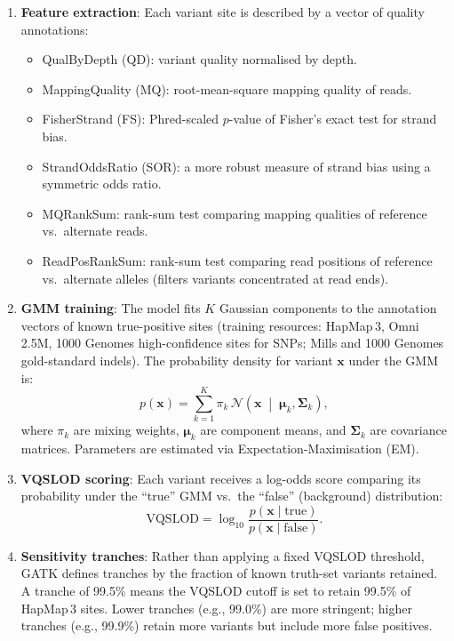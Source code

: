\begin{enumerate}[nosep]
  \item \textbf{Feature extraction}: Each variant site is described by a vector of quality annotations:
    \begin{itemize}[nosep]
      \item QualByDepth (QD): variant quality normalised by depth.
      \item MappingQuality (MQ): root-mean-square mapping quality of reads.
      \item FisherStrand (FS): Phred-scaled $p$-value of Fisher's exact test for strand bias.
      \item StrandOddsRatio (SOR): a more robust measure of strand bias using a symmetric odds ratio.
      \item MQRankSum: rank-sum test comparing mapping qualities of reference vs.\ alternate reads.
      \item ReadPosRankSum: rank-sum test comparing read positions of reference vs.\ alternate alleles (filters variants concentrated at read ends).
    \end{itemize}
  \item \textbf{GMM training}: The model fits $K$ Gaussian components to the annotation vectors of known true-positive sites (training resources: HapMap\,3, Omni\,2.5M, 1000 Genomes high-confidence sites for SNPs; Mills and 1000 Genomes gold-standard indels). The probability density for variant $\mathbf{x}$ under the GMM is:
    \begin{equation}
    \label{eq:variants:gmm}
    p(\mathbf{x}) = \sum_{k=1}^{K} \pi_k \, \mathcal{N}\!\left(\mathbf{x} \;\middle|\; \boldsymbol{\mu}_k, \boldsymbol{\Sigma}_k\right),
    \end{equation}
    where $\pi_k$ are mixing weights, $\boldsymbol{\mu}_k$ are component means, and $\boldsymbol{\Sigma}_k$ are covariance matrices. Parameters are estimated via Expectation-Maximisation (EM).
  \item \textbf{VQSLOD scoring}: Each variant receives a log-odds score comparing its probability under the ``true'' GMM vs.\ the ``false'' (background) distribution:
    \begin{equation}
    \label{eq:variants:vqslod}
    \mathrm{VQSLOD} = \log_{10} \frac{p(\mathbf{x} \mid \text{true})}{p(\mathbf{x} \mid \text{false})}.
    \end{equation}
  \item \textbf{Sensitivity tranches}: Rather than applying a fixed VQSLOD threshold, GATK defines tranches by the fraction of known truth-set variants retained. A tranche of 99.5\% means the VQSLOD cutoff is set to retain 99.5\% of HapMap\,3 sites. Lower tranches (e.g., 99.0\%) are more stringent; higher tranches (e.g., 99.9\%) retain more variants but include more false positives.
\end{enumerate}

